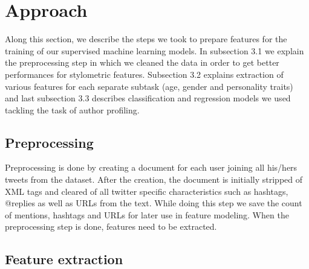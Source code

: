 \documentclass[10pt, a4paper]{article}
\begin{document}
\section{Approach}

Along this section, we describe the steps we took to prepare features for the training of our supervised machine learning models. In subsection 3.1 we explain the preprocessing step in which we cleaned the data in order to get better performances for stylometric features. Subsection 3.2 explains extraction of various features for each separate subtask (age, gender and personality traits) and last subsection 3.3 describes classification and regression models we used tackling the task of author profiling.

\subsection{Preprocessing}

Preprocessing is done by creating a document for each user joining all his/hers tweets from the dataset. After the creation, the document is initially stripped of XML tags and cleared of all twitter specific characteristics such as hashtags, @replies as well as URLs from the text. While doing this step we save the count of mentions, hashtags and URLs for later use in feature modeling. When the preprocessing step is done, features need to be extracted. \\

\subsection{Feature extraction} 
\end{document}
